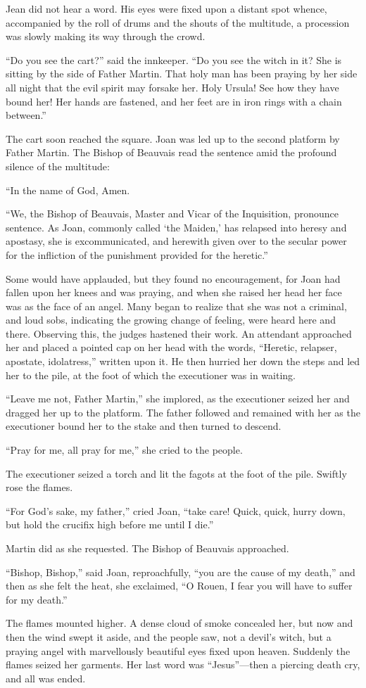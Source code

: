 Jean did not hear a word. His eyes were fixed upon a distant spot
whence, accompanied by the roll of drums and the shouts of the
multitude, a procession was slowly making its way through the crowd.

``Do you see the cart?'' said the innkeeper. ``Do you see the witch in
it? She is sitting by the side of Father Martin. That holy man has been
praying by her side all night that the evil spirit may forsake her. Holy
Ursula! See how they have bound her! Her hands are fastened, and her
feet are in iron rings with a chain between.''

The cart soon reached the square. Joan was led up to the second platform
by Father Martin. The Bishop of Beauvais read the sentence amid the
profound silence of the multitude:

``In the name of God, Amen.

``We, the Bishop of Beauvais, Master and Vicar of the Inquisition,
pronounce sentence. As Joan, commonly called `the Maiden,' has relapsed
into heresy and apostasy, she is excommunicated, and herewith given over
to the secular power for the infliction of the punishment provided for
the heretic.''

Some would have applauded, but they found no encouragement, for Joan had
fallen upon her knees and was praying, and when she raised her head her
face was as the face of an angel. Many began to realize that she was not
a criminal, and loud sobs, indicating the growing change of feeling,
were heard here and there. Observing this, the judges hastened their
work. An attendant approached her and placed a pointed cap on her head
with the words, ``Heretic, relapser, apostate, idolatress,'' written
upon it. He then hurried her down the steps and led her to the pile, at
the foot of which the executioner was in waiting.

``Leave me not, Father Martin,'' she implored, as the executioner seized
her and dragged her up to the platform. The father followed and remained
with her as the executioner bound her to the stake and then turned to
descend.

``Pray for me, all pray for me,'' she cried to the people.

The executioner seized a torch and lit the fagots at the foot of the
pile. Swiftly rose the flames.

``For God's sake, my father,'' cried Joan, ``take care! Quick, quick,
hurry down, but hold the crucifix high before me until I die.''

Martin did as she requested. The Bishop of Beauvais approached.

``Bishop, Bishop,'' said Joan, reproachfully, ``you are the cause of my
death,'' and then as she felt the heat, she exclaimed, ``O Rouen, I fear
you will have to suffer for my death.''

The flames mounted higher. A dense cloud of smoke concealed her, but now
and then the wind swept it aside, and the people saw, not a devil's
witch, but a praying angel with marvellously beautiful eyes fixed upon
heaven. Suddenly the flames seized her garments. Her last word was
``Jesus''---then a piercing death cry, and all was ended.
